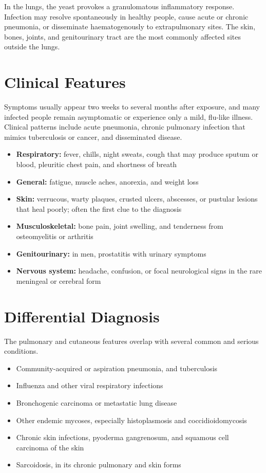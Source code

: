 In the lungs, the yeast provokes a granulomatous inflammatory response. Infection may resolve spontaneously in healthy people, cause acute or chronic pneumonia, or disseminate haematogenously to extrapulmonary sites. The skin, bones, joints, and genitourinary tract are the most commonly affected sites outside the lungs.

\section*{Clinical Features}
Symptoms usually appear two weeks to several months after exposure, and many infected people remain asymptomatic or experience only a mild, flu-like illness. Clinical patterns include acute pneumonia, chronic pulmonary infection that mimics tuberculosis or cancer, and disseminated disease.

\begin{itemize}
    \item \textbf{Respiratory:} fever, chills, night sweats, cough that may produce sputum or blood, pleuritic chest pain, and shortness of breath
    \item \textbf{General:} fatigue, muscle aches, anorexia, and weight loss
    \item \textbf{Skin:} verrucous, warty plaques, crusted ulcers, abscesses, or pustular lesions that heal poorly; often the first clue to the diagnosis
    \item \textbf{Musculoskeletal:} bone pain, joint swelling, and tenderness from osteomyelitis or arthritis
    \item \textbf{Genitourinary:} in men, prostatitis with urinary symptoms
    \item \textbf{Nervous system:} headache, confusion, or focal neurological signs in the rare meningeal or cerebral form
\end{itemize}

\section*{Differential Diagnosis}
The pulmonary and cutaneous features overlap with several common and serious conditions.

\begin{itemize}
    \item Community-acquired or aspiration pneumonia, and tuberculosis
    \item Influenza and other viral respiratory infections
    \item Bronchogenic carcinoma or metastatic lung disease
    \item Other endemic mycoses, especially histoplasmosis and coccidioidomycosis
    \item Chronic skin infections, pyoderma gangrenosum, and squamous cell carcinoma of the skin
    \item Sarcoidosis, in its chronic pulmonary and skin forms
\end{itemize}

